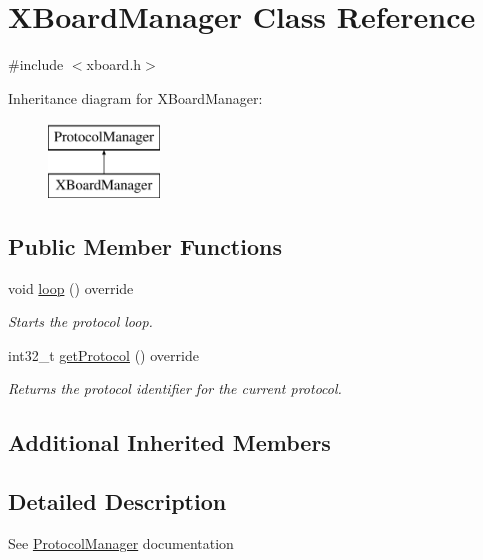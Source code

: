 \hypertarget{classXBoardManager}{}\section{X\+Board\+Manager Class Reference}
\label{classXBoardManager}


{\ttfamily \#include $<$xboard.\+h$>$}

Inheritance diagram for X\+Board\+Manager\+:\begin{figure}[H]
\begin{center}
\leavevmode
\includegraphics[height=2.000000cm]{classXBoardManager}
\end{center}
\end{figure}
\subsection*{Public Member Functions}
\begin{DoxyCompactItemize}
\item 
void \mbox{\hyperlink{classXBoardManager_a7d59ec1b3eaf1d140ad8f7cacd2ae956}{loop}} () override
\begin{DoxyCompactList}\small\item\em Starts the protocol loop. \end{DoxyCompactList}\item 
int32\+\_\+t \mbox{\hyperlink{classXBoardManager_a388ebffa15fa11ee763f4144f01fbcaf}{get\+Protocol}} () override
\begin{DoxyCompactList}\small\item\em Returns the protocol identifier for the current protocol. \end{DoxyCompactList}\end{DoxyCompactItemize}
\subsection*{Additional Inherited Members}


\subsection{Detailed Description}
See \mbox{\hyperlink{classProtocolManager}{Protocol\+Manager}} documentation 

